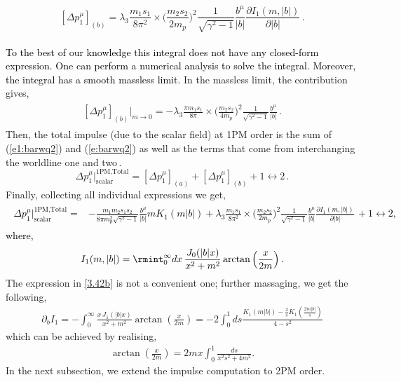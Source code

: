 \begin{equation}\label{e:barwq2}
  [\Delta p_1^{\mu}]_{(b)}=\lambda_3\frac{m_1s_1}{8\pi^2}\times \Big(\frac{m_2s_2}{2m_p}\Big)^2\frac{1}{\sqrt{\gamma^2-1}}\frac{b^\mu}{|b|}\frac{\partial I_1(m,|b|)}{\partial |b|}\,.
\end{equation}\\
\textcolor{black}{To the best of our knowledge this integral does not have any closed-form expression. One can perform a numerical analysis to solve the integral. Moreover, the integral has a smooth massless limit.} In the massless limit, the contribution gives,
\begin{align}
    \begin{split}
         [\Delta p_1^{\mu}]_{(b)}\Big|_{m\to 0}=-\lambda_3 \frac{\pi m_1s_1}{8\pi}\times \Big(\frac{m_2s_2}{4m_p}\Big)^2\frac{1}{\sqrt{\gamma^2-1}}\frac{b^\mu}{|b|}\,.
    \end{split}
\end{align}
Then, the total impulse (due to the scalar field) at 1PM order is the sum of (\ref{e1:barwq2}) and (\ref{e:barwq2})  as well as the terms that come from interchanging the worldline one and two\,.
\begin{equation}
     \Delta p_1^{\mu}\Big|^{\textrm{1PM}, \textrm{Total}}_{\textrm{scalar}}=   [\Delta p_1^{\mu}]_{(a)}+ [\Delta p_1^{\mu}]_{(b)}+1\leftrightarrow 2\,.
\end{equation}
Finally, collecting all individual expressions we get, 
\textcolor{black}{
\begin{align}
\begin{split}
\Delta p_1^{\mu}\Big|^{\textrm{1PM}, \textrm{Total}}_{\textrm{scalar}}= &-\frac{m_1m_2s_1s_2}{8\pi m_p^2\sqrt{\gamma^2-1}} \frac{b^\mu}{|b|}m K_1(m|b|)+\lambda_3\frac{m_1s_1}{8\pi^2}\times \Big(\frac{m_2s_2}{2m_p}\Big)^2\frac{1}{\sqrt{\gamma^2-1}}\frac{b^\mu}{|b|}\frac{\partial I_1(m,|b|)}{\partial |b|}\,+1\leftrightarrow 2,\label{3.42b}
\end{split}
\end{align}
where, $$I_1(m,|b|)=\rmint_{0}^{\infty}dx\,\frac{J_{0}(|b|x)}{ x^2+m^2}\arctan\Big(\frac{x}{2m}\Big)\,.$$}
The expression in \eqref{3.42b} is not a convenient one; further massaging, we get the following,
\begin{align}
   \partial_{b} I_1=- \int _0^\infty\frac{x\,J_1(|b|x)}{x^2+m^2}\arctan\left(\frac{x}{2m}\right)=-2\int_0^1 ds \frac{K_1(m|b|)-\frac{2}{s}K_1\left(\frac{2m|b|}{s}\right)}{4-s^2}
\end{align}
which can be achieved by realising,
\begin{align}
    \arctan\left(\frac{x}{2m}\right)=2mx\int_0^1 \frac{ds}{x^2s^2+4m^2}.
\end{align}
In the next subsection, we extend the impulse computation to 2PM order.

